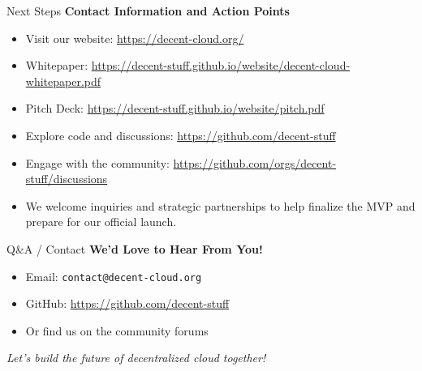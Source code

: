 \documentclass{beamer}
\begin{document}
\begin{frame}{Next Steps}
\textbf{Contact Information and Action Points}
\begin{itemize}
  \item Visit our website: \url{https://decent-cloud.org/}
  \item Whitepaper: \url{https://decent-stuff.github.io/website/decent-cloud-whitepaper.pdf}
  \item Pitch Deck: \url{https://decent-stuff.github.io/website/pitch.pdf}
  \item Explore code and discussions: \url{https://github.com/decent-stuff}
  \item Engage with the community: \url{https://github.com/orgs/decent-stuff/discussions}
  \item We welcome inquiries and strategic partnerships to help finalize the MVP and prepare for our official launch.
\end{itemize}
\end{frame}

\begin{frame}{Q\&A / Contact}
\textbf{We'd Love to Hear From You!} \\
\vspace{0.5em}
\begin{itemize}
  \item Email: \texttt{contact@decent-cloud.org}
  \item GitHub: \url{https://github.com/decent-stuff}
  \item Or find us on the community forums
\end{itemize}

\vspace{1em}
\textit{Let's build the future of decentralized cloud together!}
\end{frame}
\end{document}
